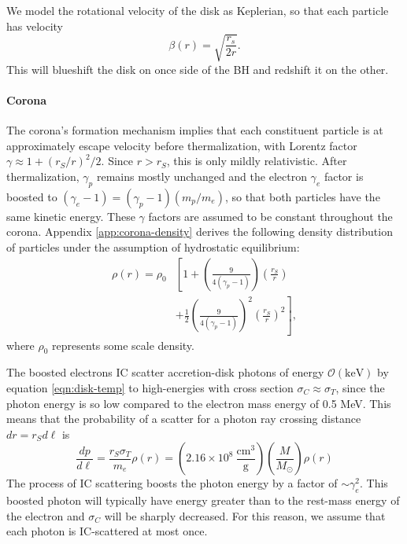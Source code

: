 \documentclass[twocolumn,twocolappendix]{aastex631}
\newcommand{\parens}[1]{\left(#1\right)}
\begin{document}
We model the rotational velocity of the disk as Keplerian, so that each particle has velocity
\begin{equation}
  \beta(r) = \sqrt{\frac{r_s}{2r}}.
\end{equation}
This will blueshift the disk on once side of the BH and redshift it on the other.

\paragraph{Corona} The corona's formation mechanism implies that each constituent particle is at approximately escape velocity before thermalization, with Lorentz factor $\gamma \approx 1 + (r_S/r)^2/2$. Since $r > r_S$, this is only mildly relativistic. After thermalization, $\gamma_p$ remains mostly unchanged and the electron $\gamma_e$ factor is boosted to $(\gamma_e -1) = (\gamma_p - 1) (m_p / m_e)$, so that both particles have the same kinetic energy. These $\gamma$ factors are assumed to be constant throughout the corona. Appendix \ref{app:corona-density} derives the following density distribution of particles under the assumption of hydrostatic equilibrium:
\begin{equation}
  \begin{split}
  \rho(r) = \rho_0 &\left[1 + \parens{\frac{9}{4(\gamma_p-1)}}\parens{\frac{r_S}{r}}\right.\\
  &+ \left. \frac{1}{2}\parens{\frac{9}{4(\gamma_p-1)}}^2\parens{\frac{r_S}{r}}^2\right],
  \end{split}
\end{equation}
where $\rho_0$ represents some scale density.

The boosted electrons IC scatter accretion-disk photons of energy $\mathcal{O}(\text{keV})$ by equation \ref{eqn:disk-temp} to high-energies with cross section $\sigma_C\approx \sigma_T$, since the photon energy is so low compared to the electron mass energy of 0.5 MeV. This means that the probability of a scatter for a photon ray crossing distance $dr = r_S d\ell$ is
\begin{equation}
  \frac{dp}{d\ell} = \frac{r_S \sigma_T}{m_e} \rho(r) = \parens{2.16 \times 10^8\ \frac{\text{cm}^3}{\text{g}}}\parens{\frac{M}{M_\odot}}\rho(r)
\end{equation}
The process of IC scattering boosts the photon energy by a factor of $\sim\gamma_e^2$. This boosted photon will typically have energy greater than to the rest-mass energy of the electron and $\sigma_C$ will be sharply decreased. For this reason, we assume that each photon is IC-scattered at most once.
\end{document}
